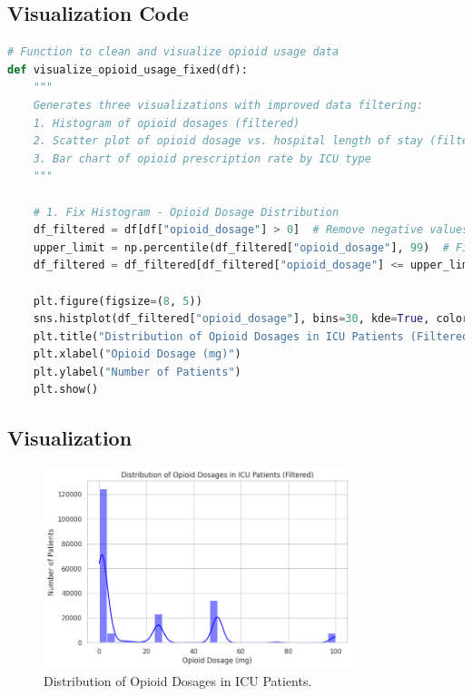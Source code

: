 \documentclass[a4paper,10pt]{article}
\begin{document}
\subsection{Visualization Code}
\begin{lstlisting}[language=Python]
# Function to clean and visualize opioid usage data
def visualize_opioid_usage_fixed(df):
    """
    Generates three visualizations with improved data filtering:
    1. Histogram of opioid dosages (filtered)
    2. Scatter plot of opioid dosage vs. hospital length of stay (filtered)
    3. Bar chart of opioid prescription rate by ICU type
    """

    # 1. Fix Histogram - Opioid Dosage Distribution
    df_filtered = df[df["opioid_dosage"] > 0]  # Remove negative values
    upper_limit = np.percentile(df_filtered["opioid_dosage"], 99)  # Find the 99th percentile
    df_filtered = df_filtered[df_filtered["opioid_dosage"] <= upper_limit]  # Remove extreme outliers

    plt.figure(figsize=(8, 5))
    sns.histplot(df_filtered["opioid_dosage"], bins=30, kde=True, color="blue")
    plt.title("Distribution of Opioid Dosages in ICU Patients (Filtered)")
    plt.xlabel("Opioid Dosage (mg)")
    plt.ylabel("Number of Patients")
    plt.show()
\end{lstlisting}

\clearpage %

\subsection{Visualization}

\begin{figure}[h]
    \centering
    \includegraphics[width=0.8\textwidth]{figure5a.png}
    \caption{Distribution of Opioid Dosages in ICU Patients.}
    \label{fig:opioid_distribution}
\end{figure}
\end{document}
